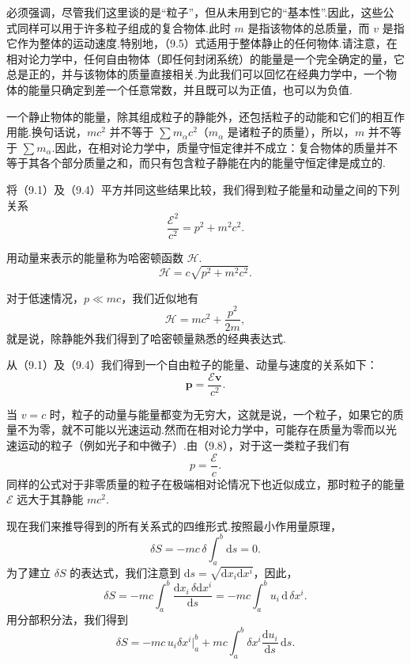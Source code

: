 必须强调，尽管我们这里谈的是“粒子”，但从未用到它的“基本性”.因此，这些公式同样可以用于许多粒子组成的复合物体.此时 $m$ 是指该物体的总质量，而 $v$ 是指它作为整体的运动速度.特别地，（9.5）式适用于整体静止的任何物体.请注意，在相对论力学中，任何自由物体（即任何封闭系统）的能量是一个完全确定的量，它总是正的，并与该物体的质量直接相关.为此我们可以回忆在经典力学中，一个物体的能量只确定到差一个任意常数，并且既可以为正值，也可以为负值.

一个静止物体的能量，除其组成粒子的静能外，还包括粒子的动能和它们的相互作用能.换句话说，$mc^2$ 并不等于 $\sum m_\alpha c^2$（$m_\alpha$ 是诸粒子的质量），所以，$m$ 并不等于 $\sum m_\alpha$.因此，在相对论力学中，质量守恒定律并不成立：复合物体的质量并不等于其各个部分质量之和，而只有包含粒子静能在内的能量守恒定律是成立的.

将（9.1）及（9.4）平方并同这些结果比较，我们得到粒子能量和动量之间的下列关系
\begin{equation}
  \frac{\mathcal{E}^2}{c^2}=p^2+m^2c^2.
\end{equation}

用动量来表示的能量称为哈密顿函数 $\mathcal{H}$.
\begin{equation}
  \mathcal{H}=c\sqrt{p^2+m^2c^2}.
\end{equation}

对于低速情况，$p\ll mc$，我们近似地有
\begin{equation*}
  \mathcal{H}=mc^2+\frac{p^2}{2m},
\end{equation*}
就是说，除静能外我们得到了哈密顿量熟悉的经典表达式.

从（9.1）及（9.4）我们得到一个自由粒子的能量、动量与速度的关系如下：
\begin{equation}
  \boldsymbol{p}=\frac{\mathcal{E}\boldsymbol{v}}{c^2}.
\end{equation}

当 $v=c$ 时，粒子的动量与能量都变为无穷大，这就是说，一个粒子，如果它的质量不为零，就不可能以光速运动.然而在相对论力学中，可能存在质量为零而以光速运动的粒子（例如光子和中微子）.由（9.8），对于这一类粒子我们有
\begin{equation}
  p=\frac{\mathcal{E}}{c}.
\end{equation}
同样的公式对于非零质量的粒子在极端相对论情况下也近似成立，那时粒子的能量 $\mathcal{E}$ 远大于其静能 $mc^2$.

现在我们来推导得到的所有关系式的四维形式.按照最小作用量原理，
\begin{equation*}
  \delta S=-mc\,\delta\int_a^b\mathrm{d}s=0.
\end{equation*}
为了建立 $\delta S$ 的表达式，我们注意到 $\mathrm{d}s=\sqrt{\mathrm{d}x_i\mathrm{d}x^i}$，因此，
\begin{equation*}
  \delta S=-mc\int_a^b\frac{\mathrm{d}x_i\,\delta\mathrm{d}x^i}{\mathrm{d}s}
  =-mc\int_a^b u_i\,\mathrm{d}\,\delta x^i.
\end{equation*}
用分部积分法，我们得到
\begin{equation}
  \delta S=-mc\,u_i\delta x^i\Big|_a^b
  +mc\int_a^b\delta x^i\frac{\mathrm{d}u_i}{\mathrm{d}s}\,\mathrm{d}s.
\end{equation}

